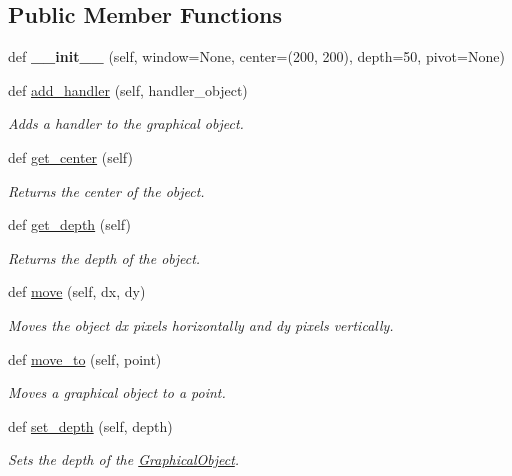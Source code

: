 \subsection*{Public Member Functions}
\begin{DoxyCompactItemize}
\item 
\mbox{\label{classcs110graphics__v2_1_1GraphicalObject_aa1ee73aca2c290252248c7a9c131cb38}} 
def {\bfseries \+\_\+\+\_\+init\+\_\+\+\_\+} (self, window=None, center=(200, 200), depth=50, pivot=None)
\item 
def \mbox{\hyperlink{classcs110graphics__v2_1_1GraphicalObject_a71b14f3ad9ad0d345f6ca0d62c4b7a5a}{add\+\_\+handler}} (self, handler\+\_\+object)
\begin{DoxyCompactList}\small\item\em Adds a handler to the graphical object. \end{DoxyCompactList}\item 
def \mbox{\hyperlink{classcs110graphics__v2_1_1GraphicalObject_aa4877c0022307a12b89f5ab25f332c08}{get\+\_\+center}} (self)
\begin{DoxyCompactList}\small\item\em Returns the center of the object. \end{DoxyCompactList}\item 
def \mbox{\hyperlink{classcs110graphics__v2_1_1GraphicalObject_a58c0dc91ebad6f07d6e175b1fd117bf4}{get\+\_\+depth}} (self)
\begin{DoxyCompactList}\small\item\em Returns the depth of the object. \end{DoxyCompactList}\item 
def \mbox{\hyperlink{classcs110graphics__v2_1_1GraphicalObject_a7f6cb53a1fb328404d842685336b89e4}{move}} (self, dx, dy)
\begin{DoxyCompactList}\small\item\em Moves the object dx pixels horizontally and dy pixels vertically. \end{DoxyCompactList}\item 
def \mbox{\hyperlink{classcs110graphics__v2_1_1GraphicalObject_ab6ac4af925b79fec3ca93b3fafed82ff}{move\+\_\+to}} (self, point)
\begin{DoxyCompactList}\small\item\em Moves a graphical object to a point. \end{DoxyCompactList}\item 
def \mbox{\hyperlink{classcs110graphics__v2_1_1GraphicalObject_a070f9867df491e5b2371992be96c3529}{set\+\_\+depth}} (self, depth)
\begin{DoxyCompactList}\small\item\em Sets the depth of the \mbox{\hyperlink{classcs110graphics__v2_1_1GraphicalObject}{Graphical\+Object}}. \end{DoxyCompactList}\end{DoxyCompactItemize}


